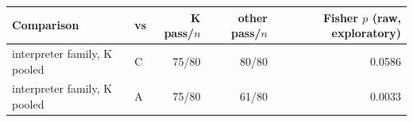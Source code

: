 \begin{tabular}{llrrr}
\toprule
Comparison & vs & K pass/$n$ & other pass/$n$ & Fisher $p$ (raw, exploratory) \\
\midrule
interpreter family, K pooled & C & 75/80 & 80/80 & 0.0586 \\
interpreter family, K pooled & A & 75/80 & 61/80 & 0.0033 \\
\bottomrule
\end{tabular}
